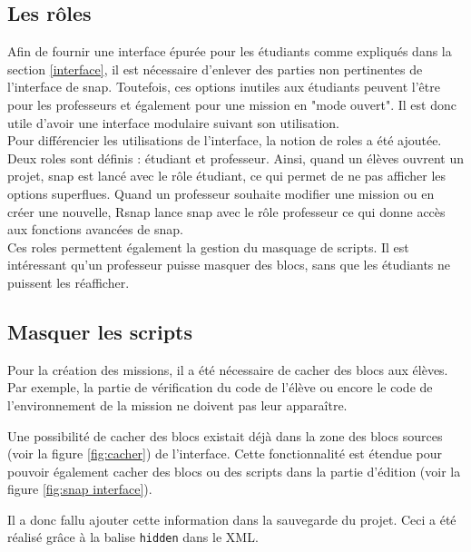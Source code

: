 \subsection{Les rôles}
\label{role}
Afin de fournir une interface épurée pour les étudiants comme expliqués dans la section \ref{interface}, il est nécessaire d'enlever des parties non pertinentes de l'interface de \gls{snap}. Toutefois, ces options inutiles aux étudiants peuvent l'être pour les professeurs et également pour une mission en "mode ouvert". Il est donc utile d'avoir une interface modulaire suivant son utilisation. \\

Pour différencier les utilisations de l'interface, la notion de \glspl{role} a été ajoutée. Deux \glspl{role} sont définis : étudiant et professeur. Ainsi, quand un élèves ouvrent un projet, \gls{snap} est lancé avec le rôle étudiant, ce qui permet de ne pas afficher les options superflues. Quand un professeur souhaite modifier une mission ou en créer une nouvelle, \gls{Rsnap} lance \gls{snap} avec le rôle professeur ce qui donne accès aux fonctions avancées de \gls{snap}.\\

Ces \glspl{role} permettent également la gestion du masquage de \glspl{script}. Il est intéressant qu'un professeur puisse masquer des \glspl{bloc}, sans que les étudiants ne puissent les réafficher.

\subsection{Masquer les scripts}
Pour la création des missions, il a été nécessaire de cacher des \glspl{bloc} aux élèves. Par exemple, la partie de vérification du code de l'élève ou encore le code de l'environnement de la mission ne doivent pas leur apparaître.

Une possibilité de cacher des \glspl{bloc} existait déjà dans la zone des \glspl{bloc} sources (voir la figure \ref{fig:cacher}) de l'interface. Cette fonctionnalité est étendue pour pouvoir également cacher des \glspl{bloc} ou des \glspl{script} dans la partie d'édition (voir la figure \ref{fig:snap interface}).

Il a donc fallu ajouter cette information dans la sauvegarde du projet. Ceci a été réalisé grâce à la balise \texttt{hidden} dans le XML.\\



